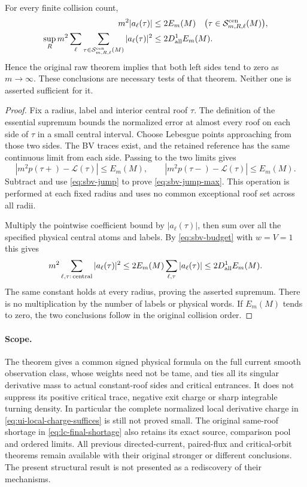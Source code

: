 \begin{proposition}
\label{prop:sbv-central-jumps}
For every finite collision count,
\begin{align}
 m^2|a_\ell(\tau)|&\le2E_m(M)
 \quad\bigl(\tau\in\mathcal S_{m,R,\ell}^{\rm cen}(M)\bigr),
                                                   \label{eq:sbv-jump-max}\\
 \sup_R m^2\sum_\ell\sum_{\tau\in
                      \mathcal S_{m,R,\ell}^{\rm cen}(M)}
                      |a_\ell(\tau)|^2
       &\le2D_{\rm all}^{1}E_m(M).                 \label{eq:sbv-jump-energy}
\end{align}
Hence the original raw theorem implies that both left sides tend
to zero as $m\to\infty$.  These conclusions are necessary tests
of that theorem.  Neither one is asserted sufficient for it.
\end{proposition}
\begin{proof}
Fix a radius, label and interior central roof $\tau$.  The definition
of the essential supremum bounds the normalized error at almost every
roof on each side of $\tau$ in a small central interval.  Choose
Lebesgue points approaching from those two sides.  The BV traces
exist, and the retained reference has the same continuous limit
from each side.  Passing to the two limits gives
\[
 |m^2p(\tau+)-\mathcal L(\tau)|\le E_m(M),\qquad
 |m^2p(\tau-)-\mathcal L(\tau)|\le E_m(M).
\]
Subtract and use \eqref{eq:sbv-jump} to prove
\eqref{eq:sbv-jump-max}.  This operation is performed at each
fixed radius and uses no common exceptional roof set across all
radii.

Multiply the pointwise coefficient bound by $|a_\ell(\tau)|$,
then sum over all the specified physical central atoms and labels.
By \eqref{eq:sbv-budget} with $w=V=1$ this gives
\[
 m^2\sum_{\ell,\tau:\,\mathrm{central}}|a_\ell(\tau)|^2
 \le2E_m(M)\sum_{\ell,\tau}|a_\ell(\tau)|
 \le2D_{\rm all}^{1}E_m(M).
\]
The same constant holds at every radius, proving the asserted
supremum.  There is no multiplication by the number of labels
or physical words.  If $E_m(M)$ tends to zero, the two conclusions
follow in the original collision order.
\end{proof}

\paragraph{Scope.}
The theorem gives a common signed physical formula on the full
current smooth observation class, whose weights need not be tame,
and ties all its singular derivative mass to actual constant-roof
sides and critical entrances.  It does not suppress its positive critical trace, negative exit
charge or sharp integrable turning density.  In particular the
complete normalized local derivative charge in
\eqref{eq:ui-local-charge-suffices} is still not proved small.
The original same-roof shortage in \eqref{eq:lc-final-shortage}
also retains its exact source, comparison pool and ordered limits.
All previous directed-current, paired-flux and critical-orbit
theorems remain available with their original stronger or
different conclusions.  The present structural result is not
presented as a rediscovery of their mechanisms.
